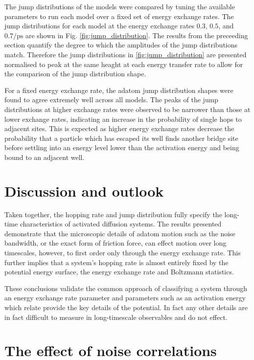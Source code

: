 \documentclass[7pt]{article}
\newcommand{\ips}{\si{\per\pico\second}}
\begin{document}
The jump distributions of the models were compared by tuning the available parameters to run each model over a fixed set of energy exchange rates. The jump distributions for each model at the energy exchange rates $0.3$, $0.5$, and $0.7\ips$ are shown in Fig. \ref{fig:jump_distribution}. The results from the preceeding section quantify the degree to which the amplitudes of the jump distributions match. Therefore the jump distributions in \ref{fig:jump_distribution} are presented normalised to peak at the same heaght at each energy transfer rate to allow for the comparison of the jump distribution shape.

For a fixed energy exchange rate, the adatom jump distribution shapes were found to agree extremely well across all models. The peaks of the jump distributions at higher exchange rates were observed to be narrower than those at lower exchange rates, indicating an increase in the probability of single hops to adjacent sites. This is expected as higher energy exchange rates decrease the probability that a particle which has escaped its well finds another bridge site before settling into an energy level lower than the activation energy and being bound to an adjacent well.  

\section*{Discussion and outlook}

Taken together, the hopping rate and jump distribution fully specify the long-time characteristics of activated diffusion systems. The results presented demonstrate that the microscopic details of adatom motion such as the noise bandwidth, or the exact form of friction force, can effect motion over long timescales, however, to first order only through the energy exchange rate. This further implies that a system's hopping rate is almost entirely fixed by the potential energy surface, the energy exchange rate and Boltzmann statistics. 

These conclusions validate the common approach of classifying a system through an energy exchange rate parameter and parameters such as an activation energy which relate provide the key details of the potential. In fact any other details are in fact difficult to measure in long-timescale observables and do not effect.

\section{The effect of noise correlations}
\end{document}
